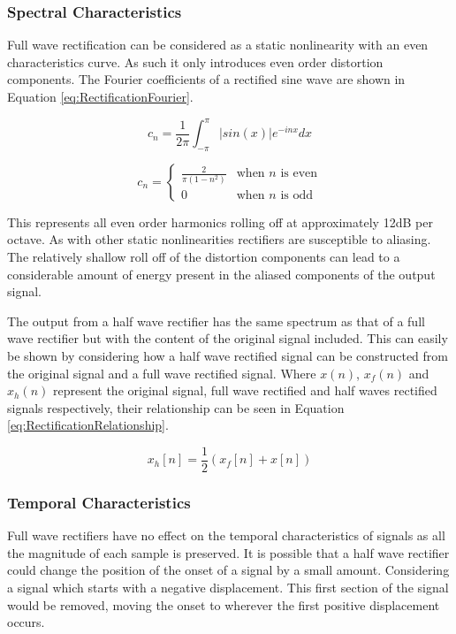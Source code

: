 		\subsubsection*{Spectral Characteristics}
			Full wave rectification can be considered as a static nonlinearity with an even characteristics
			curve. As such it only introduces even order distortion components. The Fourier coefficients of a
			rectified sine wave are shown in Equation \ref{eq:RectificationFourier}.

			\[ c_{n} = \frac{1}{2\pi} \int_{-\pi}^{\pi} |sin(x)|e^{-inx} dx \]

			\begin{equation}
				c_{n} = \begin{cases}
					\frac{2}{\pi(1 - n^{2})} & \text{when $n$ is even} \\
					0 & \text{when $n$ is odd}
				\end{cases}
				\label{eq:RectificationFourier}
			\end{equation}

			This represents all even order harmonics rolling off at approximately 12dB per octave.  As with
			other static nonlinearities rectifiers are susceptible to aliasing. The relatively shallow roll off
			of the distortion components can lead to a considerable amount of energy present in the aliased
			components of the output signal. 

			The output from a half wave rectifier has the same spectrum as that of a full wave rectifier
			but with the content of the original signal included. This can easily be shown by considering how a
			half wave rectified signal can be constructed from the original signal and a full wave rectified
			signal. Where $x(n)$, $x_{f}(n)$ and $x_{h}(n)$ represent the original signal, full wave rectified
			and half waves rectified signals respectively, their relationship can be seen in Equation
			\ref{eq:RectificationRelationship}.

			\begin{equation}
				x_{h}[n] = \frac{1}{2} \left( x_{f}[n] + x[n] \right)
				\label{eq:RectificationRelationship}
			\end{equation}

		\subsubsection*{Temporal Characteristics}
			Full wave rectifiers have no effect on the temporal characteristics of signals as all the magnitude
			of each sample is preserved. It is possible that a half wave rectifier could change the position of
			the onset of a signal by a small amount. Considering a signal which starts with a negative
			displacement. This first section of the signal would be removed, moving the onset to wherever the
			first positive displacement occurs.
			
